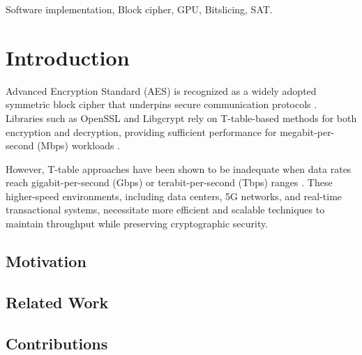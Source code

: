 \documentclass[journal]{IEEEtran}
\begin{document}
\begin{IEEEkeywords}
   Software implementation, Block cipher, GPU, Bitslicing, SAT.
\end{IEEEkeywords}

\color{blue}
\section{Introduction}
\label{sec:intro}



 Advanced Encryption Standard (AES) is recognized as a widely adopted symmetric block cipher that underpins secure communication protocols \cite{Daemen2020}. Libraries such as OpenSSL and Libgcrypt rely on T-table-based methods for both encryption and decryption, providing sufficient performance for megabit-per-second (Mbps) workloads \cite{Jancar2024, Marshall2021}. 

However, T-table approaches have been shown to be inadequate when data rates reach gigabit-per-second (Gbps) or terabit-per-second (Tbps) ranges \cite{Li2020}. These higher-speed environments, including data centers, 5G networks, and real-time transactional systems, necessitate more efficient and scalable techniques to maintain throughput while preserving cryptographic security.

\subsection{Motivation}

\subsection{Related Work}

\cite{Lee2022} 
\subsection{Contributions}



\color{black}

\end{document}
